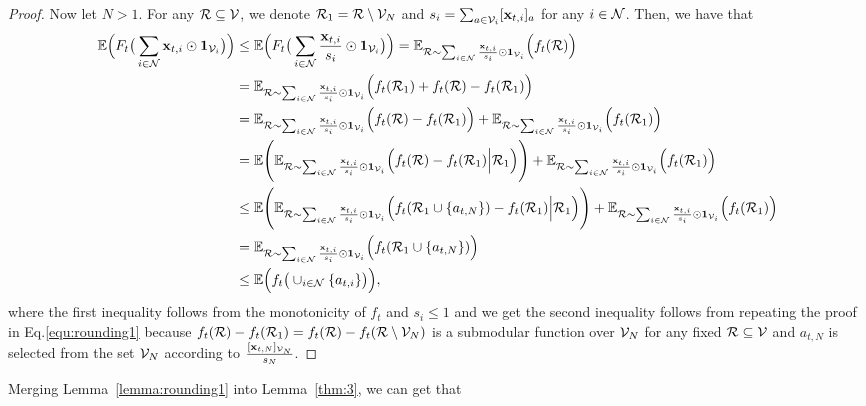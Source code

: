 \begin{proof}
Now let $N>1$. For any $\mathcal{R}\subseteq\mathcal{V}$, we denote $\mathcal{R}_{1}=\mathcal{R}\setminus\mathcal{V}_{N}$ and $s_{i}=\sum_{a\in\mathcal{V}_{i}}[\mathbf{x}_{t,i}]_{a}$ for any $i\in\mathcal{N}$. Then, we have that\begin{equation*}
	\begin{aligned}
		\mathbb{E}\Big(F_{t}\big(\sum_{i\in\mathcal{N}}\mathbf{x}_{t,i}\odot\mathbf{1}_{\mathcal{V}_{i}}\big)\Big)&\le 	\mathbb{E}\Big(F_{t}\big(\sum_{i\in\mathcal{N}}\frac{\mathbf{x}_{t,i}}{s_{i}}\odot\mathbf{1}_{\mathcal{V}_{i}}\big)\Big)=\mathbb{E}_{\mathcal{R}\sim\sum_{i\in\mathcal{N}}\frac{\mathbf{x}_{t,i}}{s_{i}}\odot\mathbf{1}_{\mathcal{V}_{i}}}\Big(f_{t}(\mathcal{R})\Big)\\
		&=\mathbb{E}_{\mathcal{R}\sim\sum_{i\in\mathcal{N}}\frac{\mathbf{x}_{t,i}}{s_{i}}\odot\mathbf{1}_{\mathcal{V}_{i}}}\Big(f_{t}(\mathcal{R}_{1})+f_{t}(\mathcal{R})-f_{t}(\mathcal{R}_{1})\Big)\\
		&=\mathbb{E}_{\mathcal{R}\sim\sum_{i\in\mathcal{N}}\frac{\mathbf{x}_{t,i}}{s_{i}}\odot\mathbf{1}_{\mathcal{V}_{i}}}\Big(f_{t}(\mathcal{R})-f_{t}(\mathcal{R}_{1})\Big)+\mathbb{E}_{\mathcal{R}\sim\sum_{i\in\mathcal{N}}\frac{\mathbf{x}_{t,i}}{s_{i}}\odot\mathbf{1}_{\mathcal{V}_{i}}}\Big(f_{t}(\mathcal{R}_{1})\Big)\\
	&=\mathbb{E}\Bigg(\mathbb{E}_{\mathcal{R}\sim\sum_{i\in\mathcal{N}}\frac{\mathbf{x}_{t,i}}{s_{i}}\odot\mathbf{1}_{\mathcal{V}_{i}}}\Big(f_{t}(\mathcal{R})-f_{t}(\mathcal{R}_{1})\Big|\mathcal{R}_{1}\Big)\Bigg)+\mathbb{E}_{\mathcal{R}\sim\sum_{i\in\mathcal{N}}\frac{\mathbf{x}_{t,i}}{s_{i}}\odot\mathbf{1}_{\mathcal{V}_{i}}}\Big(f_{t}(\mathcal{R}_{1})\Big)\\
	&\le\mathbb{E}\Bigg(\mathbb{E}_{\mathcal{R}\sim\sum_{i\in\mathcal{N}}\frac{\mathbf{x}_{t,i}}{s_{i}}\odot\mathbf{1}_{\mathcal{V}_{i}}}\Big(f_{t}(\mathcal{R}_{1}\cup\{a_{t,N}\})-f_{t}(\mathcal{R}_{1})\Big|\mathcal{R}_{1}\Big)\Bigg)+\mathbb{E}_{\mathcal{R}\sim\sum_{i\in\mathcal{N}}\frac{\mathbf{x}_{t,i}}{s_{i}}\odot\mathbf{1}_{\mathcal{V}_{i}}}\Big(f_{t}(\mathcal{R}_{1})\Big)\\	&=\mathbb{E}_{\mathcal{R}\sim\sum_{i\in\mathcal{N}}\frac{\mathbf{x}_{t,i}}{s_{i}}\odot\mathbf{1}_{\mathcal{V}_{i}}}\Big(f_{t}(\mathcal{R}_{1}\cup\{a_{t,N}\})\Big)\\
	&\le \mathbb{E}\Big(f_{t}\big(\cup_{i\in\mathcal{N}}\{a_{t,i}\}\big)\Big),
	\end{aligned}
\end{equation*} where the first inequality follows from the monotonicity of $f_{t}$ and $s_{i}\le1$ and we get the second inequality follows from repeating the proof in Eq.\eqref{equ:rounding1} because $f_{t}(\mathcal{R})-f_{t}(\mathcal{R}_{1})=f_{t}(\mathcal{R})-f_{t}(\mathcal{R}\setminus\mathcal{V}_{N})$ is a submodular function over $\mathcal{V}_{N}$ for any fixed $\mathcal{R}\subseteq\mathcal{V}$ and $a_{t,N}$ is selected from the set $\mathcal{V}_{N}$ according to $\frac{[\mathbf{x}_{t,N}]_{\mathcal{V}_{N}}}{s_{N}}$.
\end{proof}
Merging Lemma~\ref{lemma:rounding1} into Lemma~\ref{thm:3}, we can get that
